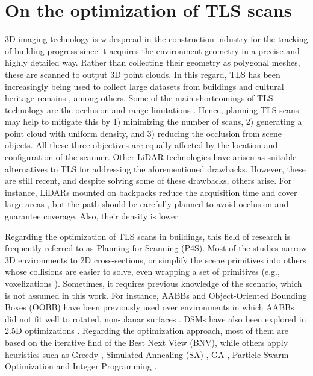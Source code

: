 \section{On the optimization of TLS scans}

3D imaging technology is widespread in the construction industry for the tracking of building progress since it acquires the environment geometry in a precise and highly detailed way. Rather than collecting their geometry as polygonal meshes, these are scanned to output 3D point clouds. In this regard, TLS has been increasingly being used to collect large datasets from buildings \cite{shariq_revolutionising_2020} and cultural heritage remains \cite{banfi_integration_2019, ham_phased_2020, andriasyan_point_2020}, among others. Some of the main shortcomings of TLS technology are the occlusion and range limitations \cite{soudarissanane_optimizing_2012}. Hence, planning TLS scans may help to mitigate this by 1) minimizing the number of scans, 2) generating a point cloud with uniform density, and 3) reducing the occlusion from scene objects. All these three objectives are equally affected by the location and configuration of the scanner. Other LiDAR technologies have arisen as suitable alternatives to TLS for addressing the aforementioned drawbacks. However, these are still recent, and despite solving some of these drawbacks, others arise. For instance, LiDARs mounted on backpacks reduce the acquisition time and cover large areas \cite{rodriguez-gonzalvez_mobile_2017}, but the path should be carefully planned to avoid occlusion and guarantee coverage. Also, their density is lower \cite{bienert_comparison_2018}.

Regarding the optimization of TLS scans in buildings, this field of research is frequently referred to as Planning for Scanning (P4S). Most of the studies narrow 3D environments to 2D cross-sections, or simplify the scene primitives into others whose collisions are easier to solve, even wrapping a set of primitives (e.g., voxelizations \cite{wakisaka_optimal_2019}). Sometimes, it requires previous knowledge of the scenario, which is not assumed in this work. For instance, AABBs and Object-Oriented Bounding Boxes (OOBB) have been previously used over environments in which AABBs did not fit well to rotated, non-planar surfaces \cite{li_3d_2022}. DSMs have also been explored in 2.5D optimizations \cite{starek_viewshed_2020}. Regarding the optimization approach, most of them are based on the iterative find of the Best Next View (BNV), while others apply heuristics such as Greedy \cite{ giorgini_sensor-based_2019},  Simulated Annealing (SA) \cite{chen_indoor_2018}, GA \cite{jia_comparison_2017}, Particle Swarm Optimization \cite{jia_comparison_2017} and Integer Programming \cite{wakisaka_optimal_2019}.


